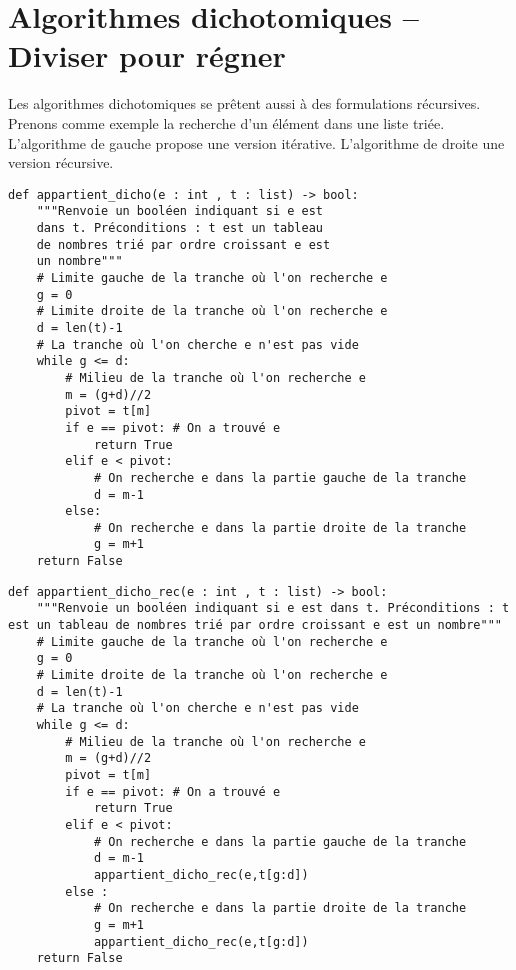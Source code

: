 \section{Algorithmes dichotomiques -- Diviser pour régner}

Les algorithmes dichotomiques se prêtent aussi à des formulations récursives. Prenons comme exemple la recherche d'un élément dans une liste triée. L'algorithme de gauche propose une version itérative. L'algorithme de droite une version récursive. 

\begin{lstlisting}
def appartient_dicho(e : int , t : list) -> bool:
    """Renvoie un booléen indiquant si e est 
    dans t. Préconditions : t est un tableau 
    de nombres trié par ordre croissant e est 
    un nombre"""
    # Limite gauche de la tranche où l'on recherche e
    g = 0 
    # Limite droite de la tranche où l'on recherche e
    d = len(t)-1 
    # La tranche où l'on cherche e n'est pas vide
    while g <= d: 
        # Milieu de la tranche où l'on recherche e
        m = (g+d)//2 
        pivot = t[m]
        if e == pivot: # On a trouvé e
            return True
        elif e < pivot:
            # On recherche e dans la partie gauche de la tranche
            d = m-1 
        else:
            # On recherche e dans la partie droite de la tranche
            g = m+1 
    return False
\end{lstlisting}

\begin{lstlisting}
def appartient_dicho_rec(e : int , t : list) -> bool:
    """Renvoie un booléen indiquant si e est dans t. Préconditions : t est un tableau de nombres trié par ordre croissant e est un nombre"""
    # Limite gauche de la tranche où l'on recherche e
    g = 0 
    # Limite droite de la tranche où l'on recherche e
    d = len(t)-1 
    # La tranche où l'on cherche e n'est pas vide
    while g <= d:
        # Milieu de la tranche où l'on recherche e 
        m = (g+d)//2 
        pivot = t[m]
        if e == pivot: # On a trouvé e
            return True
        elif e < pivot:
            # On recherche e dans la partie gauche de la tranche
            d = m-1 
            appartient_dicho_rec(e,t[g:d])
        else :
            # On recherche e dans la partie droite de la tranche
            g = m+1
            appartient_dicho_rec(e,t[g:d])
    return False
\end{lstlisting}

